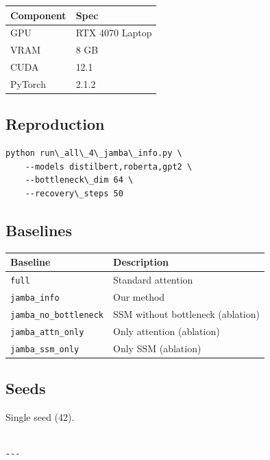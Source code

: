 \begin{table}[H]
\centering
\small
\begin{tabular}{ll}
\toprule
\textbf{Component} & \textbf{Spec} \\
\midrule
GPU & RTX 4070 Laptop \\
VRAM & 8 GB \\
CUDA & 12.1 \\
PyTorch & 2.1.2 \\
\bottomrule
\end{tabular}
\end{table}

\subsection{Reproduction}

\begin{lstlisting}
python run\_all\_4\_jamba\_info.py \
    --models distilbert,roberta,gpt2 \
    --bottleneck\_dim 64 \
    --recovery\_steps 50
\end{lstlisting}

\subsection{Baselines}

\begin{table}[H]
\centering
\small
\begin{tabular}{ll}
\toprule
\textbf{Baseline} & \textbf{Description} \\
\midrule
\texttt{full} & Standard attention \\
\texttt{jamba\_info} & Our method \\
\texttt{jamba\_no\_bottleneck} & SSM without bottleneck (ablation) \\
\texttt{jamba\_attn\_only} & Only attention (ablation) \\
\texttt{jamba\_ssm\_only} & Only SSM (ablation) \\
\bottomrule
\end{tabular}
\end{table}

\subsection{Seeds}

Single seed (42).
\begin{lstlisting}

---
\end{lstlisting}

